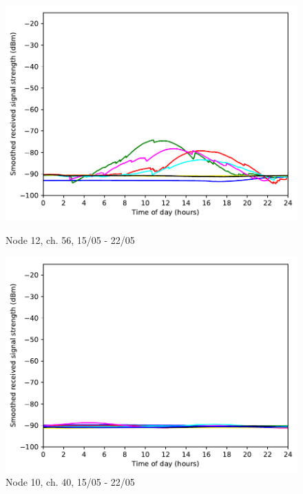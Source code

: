 \documentclass[a4paper, 11pt]{article}
\begin{document}
\begin{figure}[!h]
\begin{minipage}{0.47\textwidth}
	\centering
	\includegraphics[width=\textwidth]{images/5_GHz/cot-node12-student_2017-05-21_chan56_image.pdf}
	\caption{Node 12, ch. 56, 15/05 - 22/05}
	\label{node12_ch56_usage}
\end{minipage}\hfill
\begin{minipage}{0.47\textwidth}
	\centering
	\includegraphics[width=\textwidth]{images/5_GHz/cot-node10-student_2017-05-22_chan40_image.pdf}
	\caption{Node 10, ch. 40, 15/05 - 22/05}
	\label{node10_ch40_usage}
\end{minipage}\hfill
\end{figure}
\end{document}
